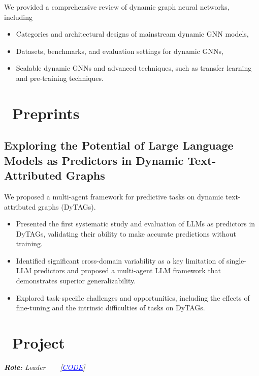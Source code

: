\documentclass{resume}
\begin{document}
We provided a comprehensive review of dynamic graph neural networks, including 
\begin{itemize}
  \item Categories and architectural designs of mainstream dynamic GNN models,
  \item Datasets, benchmarks, and evaluation settings for dynamic GNNs,
  \item Scalable dynamic GNNs and advanced techniques, such as transfer learning and pre-training techniques.
\end{itemize}

\section{\faLeanpub\ Preprints}
\subsection{\bf Exploring the Potential of Large Language Models as Predictors in Dynamic Text-Attributed Graphs} 

We proposed a multi-agent framework for predictive tasks on dynamic text-attributed graphs (DyTAGs).
\begin{itemize}
  \item Presented the first systematic study and evaluation of LLMs as predictors in DyTAGs, validating their ability to make accurate predictions without training.
  \item Identified significant cross-domain variability as a key limitation of single-LLM predictors and proposed a multi-agent LLM framework that demonstrates superior generalizability.
  \item Explored task-specific challenges and opportunities, including the effects of fine-tuning and the intrinsic difficulties of tasks on DyTAGs.
\end{itemize}

\section{\faHeartO\ Project}
 {\it{\textbf{Role:} Leader}~~~~[\href{https://github.com/easter-mips}{\textcolor{blue}{\underline{CODE}}}]}
\end{document}

